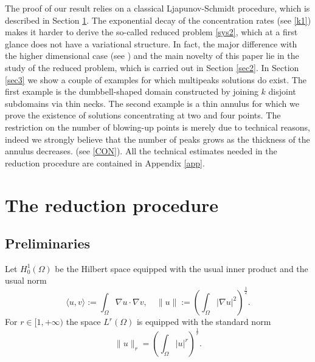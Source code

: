 \documentclass[11pt,a4paper]{amsart}
\theoremstyle{definition}
\renewcommand{\(}{\left(}
\renewcommand{\)}{\right)}
\begin{document}
The proof of our result relies on a classical Ljapunov-Schmidt procedure, which is described in Section \ref{sec1}. The exponential decay of the concentration rates (see \eqref{k1})
makes it harder to derive  the so-called reduced problem \eqref{sys2}, which at a first glance does not have a variational structure.
In fact, the major difference with the higher dimensional case  (see \cite{MP}) and the main novelty of this paper lie in the study of the reduced problem, which is  carried out in  Section \ref{sec2}. In Section \ref{sec3} we show a couple of examples for which multipeaks solutions do exist. The first example is the dumbbell-shaped domain constructed by joining $k$ disjoint subdomains via thin necks. The second example is a thin annulus for which we prove the existence of solutions concentrating at two and four points. The restriction on the number of blowing-up points is merely due to technical reasons, indeed we strongly believe that the number of peaks grows as the thickness of the annulus decreases. (see \eqref{CON}).
All the technical estimates needed in  the reduction procedure are contained in  Appendix \ref{app}.

\section{The reduction procedure}\label{sec1}

\subsection{Preliminaries}
Let $H^{1}_{0}(\Omega)$ be the Hilbert space equipped with the usual inner product and the usual norm 
\begin{equation*}
\langle u,v \rangle := \int_{\Omega} \nabla u \cdot \nabla v ,\quad \| u \|  := \left( \int_{\Omega} | \nabla u |^{2} \right)^{\frac{1}{2}}.
\end{equation*}
For $r \in [1, +\infty)$ the space $L^{r}(\Omega)$ is  equipped with the standard norm 
\begin{equation*}
\| u \|_{r} = \left( \int_{\Omega} |u|^{r} \right)^{\frac{1}{r}}.
\end{equation*}
\end{document}

